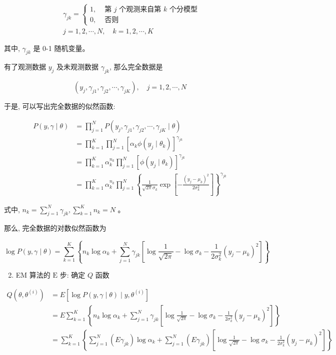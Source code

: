 \documentclass[10pt]{article}
\begin{document}
\begin{align*}
& \gamma_{j k}= \begin{cases}1, & \text { 第 } j \text { 个观测来自第 } k \text { 个分模型 } \\
0, & \text { 否则 }\end{cases} \\
& j=1,2, \cdots, N, \quad k=1,2, \cdots, K \tag{9.27}
\end{align*}


其中, $\gamma_{j k}$ 是 0-1 随机变量。

有了观测数据 $y_{j}$ 及未观测数据 $\gamma_{j k}$, 那么完全数据是

$$
\left(y_{j}, \gamma_{j 1}, \gamma_{j 2}, \cdots, \gamma_{j K}\right), \quad j=1,2, \cdots, N
$$

于是, 可以写出完全数据的似然函数:

$$
\begin{aligned}
P(y, \gamma \mid \theta) & =\prod_{j=1}^{N} P\left(y_{j}, \gamma_{j 1}, \gamma_{j 2}, \cdots, \gamma_{j K} \mid \theta\right) \\
& =\prod_{k=1}^{K} \prod_{j=1}^{N}\left[\alpha_{k} \phi\left(y_{j} \mid \theta_{k}\right)\right]^{\gamma_{j k}} \\
& =\prod_{k=1}^{K} \alpha_{k}^{n_{k}} \prod_{j=1}^{N}\left[\phi\left(y_{j} \mid \theta_{k}\right)\right]^{\gamma_{j k}} \\
& =\prod_{k=1}^{K} \alpha_{k}^{n_{k}} \prod_{j=1}^{N}\left\{\frac{1}{\sqrt{2 \pi} \sigma_{k}} \exp \left[-\frac{\left(y_{j}-\mu_{k}\right)^{2}}{2 \sigma_{k}^{2}}\right]\right\}^{\gamma_{j k}}
\end{aligned}
$$

式中, $n_{k}=\sum_{j=1}^{N} \gamma_{j k}, \sum_{k=1}^{K} n_{k}=N$ 。

那么, 完全数据的对数似然函数为

$$
\log P(y, \gamma \mid \theta)=\sum_{k=1}^{K}\left\{n_{k} \log \alpha_{k}+\sum_{j=1}^{N} \gamma_{j k}\left[\log \frac{1}{\sqrt{2 \pi}}-\log \sigma_{k}-\frac{1}{2 \sigma_{k}^{2}}\left(y_{j}-\mu_{k}\right)^{2}\right]\right\}
$$

\begin{enumerate}
  \setcounter{enumi}{1}
  \item EM 算法的 $\mathrm{E}$ 步: 确定 $Q$ 函数
\end{enumerate}


\begin{align*}
Q\left(\theta, \theta^{(i)}\right) & =E\left[\log P(y, \gamma \mid \theta) \mid y, \theta^{(i)}\right] \\
& =E \sum_{k=1}^{K}\left\{n_{k} \log \alpha_{k}+\sum_{j=1}^{N} \gamma_{j k}\left[\log \frac{1}{\sqrt{2 \pi}}-\log \sigma_{k}-\frac{1}{2 \sigma_{k}^{2}}\left(y_{j}-\mu_{k}\right)^{2}\right]\right\} \\
& =\sum_{k=1}^{K}\left\{\sum_{j=1}^{N}\left(E \gamma_{j k}\right) \log \alpha_{k}+\sum_{j=1}^{N}\left(E \gamma_{j k}\right)\left[\log \frac{1}{\sqrt{2 \pi}}-\log \sigma_{k}-\frac{1}{2 \sigma_{k}^{2}}\left(y_{j}-\mu_{k}\right)^{2}\right]\right\} \tag{9.28}
\end{align*}
\end{document}
